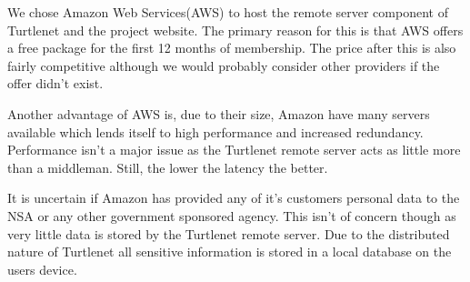 We chose Amazon Web Services(AWS) to host the remote server component of Turtlenet and the project website.
The primary reason for this is that AWS offers a free package for the first 12 months of membership. The price after
this is also fairly competitive although we would probably consider other providers if the offer didn't exist. \par

Another advantage of AWS is, due to their size, Amazon have many servers available which lends itself to high 
performance and increased redundancy. Performance isn't a major issue as the Turtlenet remote server acts as little 
more than a middleman. Still, the lower the latency the better. \par

It is uncertain if Amazon has provided any of it's customers personal data to the NSA or any other government sponsored 
agency. This isn't of concern though as very little data is stored by the Turtlenet remote server. Due to the 
distributed nature of Turtlenet all sensitive information is stored in a local database on the users device.
